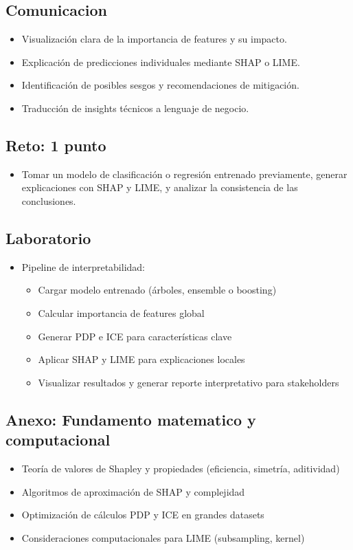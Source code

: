 \documentclass[12pt,a4paper,openany,oneside]{book}
\begin{document}
\begin{itemize}
\subsection{Comunicacion}
\begin{itemize}
    \item Visualización clara de la importancia de features y su impacto.
    \item Explicación de predicciones individuales mediante SHAP o LIME.
    \item Identificación de posibles sesgos y recomendaciones de mitigación.
    \item Traducción de insights técnicos a lenguaje de negocio.
\end{itemize}

\subsection{Reto: 1 punto}
\begin{itemize}
    \item Tomar un modelo de clasificación o regresión entrenado previamente, generar explicaciones con SHAP y LIME, y analizar la consistencia de las conclusiones.
\end{itemize}

\subsection{Laboratorio}
\begin{itemize}
    \item Pipeline de interpretabilidad:
    \begin{itemize}
        \item Cargar modelo entrenado (árboles, ensemble o boosting)
        \item Calcular importancia de features global
        \item Generar PDP e ICE para características clave
        \item Aplicar SHAP y LIME para explicaciones locales
        \item Visualizar resultados y generar reporte interpretativo para stakeholders
    \end{itemize}
\end{itemize}

\subsection{Anexo: Fundamento matematico y computacional}
\begin{itemize}
    \item Teoría de valores de Shapley y propiedades (eficiencia, simetría, aditividad)
    \item Algoritmos de aproximación de SHAP y complejidad
    \item Optimización de cálculos PDP y ICE en grandes datasets
    \item Consideraciones computacionales para LIME (subsampling, kernel)
\end{itemize}


\end{itemize}
\end{document}
